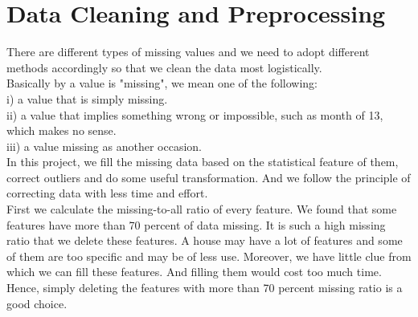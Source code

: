 \documentclass[conference]{IEEEtran}
\begin{document}
\section{Data Cleaning and Preprocessing}\label{iii}
\indent There are different types of missing values and we need to adopt different methods accordingly so that we clean the data most logistically. \\ Basically by a value is "missing", we mean one of the following: \\
i) a value that is simply missing. \\
ii) a value that implies something wrong or impossible, such as month of 13, which makes no sense. \\
iii) a value missing as another occasion. \\
\indent In this project, we fill the missing data based on the statistical feature of them, correct outliers and do some useful transformation. And we follow the principle of correcting data with less time and effort. \\
\indent First we calculate the missing-to-all ratio of every feature. We found that some features have more than 70 percent of data missing. It is such a high missing ratio that we delete these features. A house may have a lot of features and some of them are too specific and may be of less use. Moreover, we have little clue from which we can fill these features. And filling them would cost too much time. Hence, simply deleting the features with more than 70 percent missing ratio is a good choice. \\
\indent 
\end{document}
